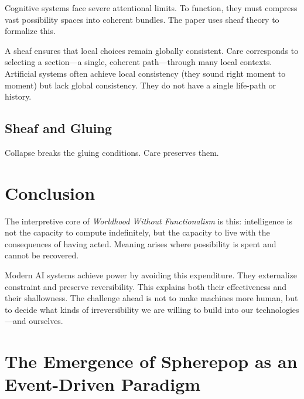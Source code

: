\documentclass[11pt]{article}
\begin{document}
Cognitive systems face severe attentional limits. To function, they must compress vast possibility spaces into coherent bundles. The paper uses sheaf theory to formalize this.

A sheaf ensures that local choices remain globally consistent. Care corresponds to selecting a section—a single, coherent path—through many local contexts. Artificial systems often achieve local consistency (they sound right moment to moment) but lack global consistency. They do not have a single life-path or history.

\subsection*{Sheaf and Gluing}

\begin{center}
\end{center}

Collapse breaks the gluing conditions. Care preserves them.

\section{Conclusion}

The interpretive core of \textit{Worldhood Without Functionalism} is this: intelligence is not the capacity to compute indefinitely, but the capacity to live with the consequences of having acted. Meaning arises where possibility is spent and cannot be recovered.

Modern AI systems achieve power by avoiding this expenditure. They externalize constraint and preserve reversibility. This explains both their effectiveness and their shallowness. The challenge ahead is not to make machines more human, but to decide what kinds of irreversibility we are willing to build into our technologies—and ourselves.

\section{The Emergence of Spherepop as an Event-Driven Paradigm}
\end{document}
